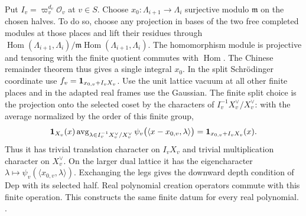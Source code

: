 Put \(I_v=\varpi_v^{d_v}\mathcal O_v\) at \(v\in S\). Choose
\(x_0:\Lambda_{i+1}\to\Lambda_i\) surjective modulo
\(\mathfrak m\) on the chosen halves. To do so, choose any projection
in bases of the two free completed modules at those places and lift
their residues through
\(\operatorname{Hom}(\Lambda_{i+1},\Lambda_i)/
  \mathfrak m\operatorname{Hom}(\Lambda_{i+1},\Lambda_i)\).
The homomorphism module is projective and tensoring with the finite
quotient commutes with \(\operatorname{Hom}\). The Chinese remainder
theorem thus gives a single integral \(x_0\). In the split
Schr\"odinger coordinate use
\(f_v={\bf1}_{x_{0,v}+I_vX_v}\). Use the unit lattice vacuum
at all other finite places and in the adapted real frames use the
Gaussian. The finite split choice is the projection onto the selected
coset by the characters of \(I_v^{-1}X_v^\vee/X_v^\vee\):
with the average normalized by the order of this finite group,
\[
 {\bf1}_{X_v}(x)
  \operatorname{avg}_{\lambda\in I_v^{-1}X_v^\vee/X_v^\vee}
          \psi_v\bigl(\langle x-x_{0,v},\lambda\rangle\bigr)
       ={\bf1}_{x_{0,v}+I_vX_v}(x).
\]
Thus it has trivial translation character on \(I_vX_v\) and
trivial multiplication character on \(X_v^\vee\). On the larger
dual lattice it has the eigencharacter
\(\lambda\mapsto\psi_v(\langle x_{0,v},\lambda\rangle)\).
Exchanging the legs gives the downward depth condition of
\(\mathrm{Dep}\) with its selected half. Real polynomial creation
operators commute with this finite operation. This constructs the
same finite datum for every real polynomial.
.

